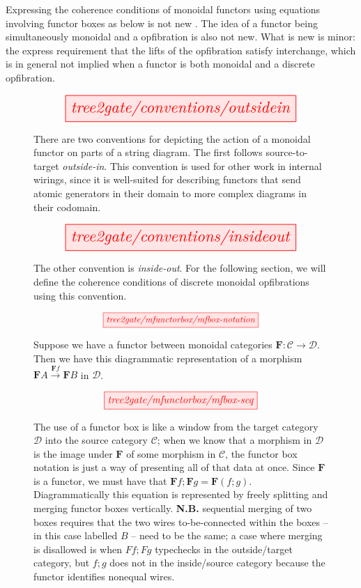 \begin{scholium}
Expressing the coherence conditions of monoidal functors using equations involving functor boxes as below is not new \citep{melliesFunctorialBoxesString2006b}. The idea of a functor being simultaneously monoidal and a opfibration is also not new. What is new is minor: the express requirement that the lifts of the opfibration satisfy interchange, which is in general not implied when a functor is both monoidal and a discrete opfibration.
\end{scholium}

\begin{figure}[h!]\label{fig:outsidein}
\centering
\[\resizebox{0.75\textwidth}{!}{\tikzfig{tree2gate/conventions/outsidein}}\]
\caption{There are two conventions for depicting the action of a monoidal functor on parts of a string diagram. The first follows source-to-target \emph{outside-in}. This convention is used for other work in internal wirings, since it is well-suited for describing functors that send atomic generators in their domain to more complex diagrams in their codomain.}
\end{figure}

\begin{figure}[h!]\label{fig:insideout}
\centering
\[\resizebox{0.75\textwidth}{!}{\tikzfig{tree2gate/conventions/insideout}}\]
\caption{The other convention is \emph{inside-out}. For the following section, we will define the coherence conditions of discrete monoidal opfibrations using this convention.}
\end{figure}

\begin{figure}[h!]
\[\resizebox{0.5\textwidth}{!}{\tikzfig{tree2gate/mfunctorbox/mfbox-notation}}\]
\caption{Suppose we have a functor between monoidal categories $\mathbf{F}: \mathcal{C} \rightarrow \mathcal{D}$. Then we have this diagrammatic representation of a morphism $\mathbf{F}A \overset{\mathbf{F}f}{\rightarrow} \mathbf{F}B$ in $\mathcal{D}$.}
\end{figure}

\begin{figure}[h!]
\[\resizebox{0.5\textwidth}{!}{\tikzfig{tree2gate/mfunctorbox/mfbox-seq}}\]
\caption{The use of a functor box is like a window from the target category $\mathcal{D}$ into the source category $\mathcal{C}$; when we know that a morphism in $\mathcal{D}$ is the image under $\mathbf{F}$ of some morphism in $\mathcal{C}$, the functor box notation is just a way of presenting all of that data at once. Since $\mathbf{F}$ is a functor, we must have that $\mathbf{F}f ; \mathbf{F}g = \mathbf{F}(f;g)$. Diagrammatically this equation is represented by freely splitting and merging functor boxes vertically. \textbf{N.B.} sequential merging of two boxes requires that the two wires to-be-connected within the boxes -- in this case labelled $B$ -- need to be the same; a case where merging is disallowed is when $Ff;Fg$ typechecks in the outside/target category, but $f;g$ does not in the inside/source category because the functor identifies nonequal wires.}
\end{figure}

